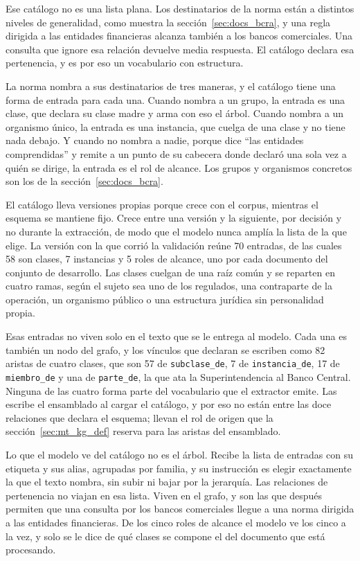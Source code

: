 \documentclass[12pt,a4paper]{report}
\begin{document}
Ese catálogo no es una lista plana. Los destinatarios de la norma están a distintos niveles de generalidad, como muestra la sección~\ref{sec:docs_bcra}, y una regla dirigida a las entidades financieras alcanza también a los bancos comerciales. Una consulta que ignore esa relación devuelve media respuesta. El catálogo declara esa pertenencia, y es por eso un vocabulario con estructura.

La norma nombra a sus destinatarios de tres maneras, y el catálogo tiene una forma de entrada para cada una. Cuando nombra a un grupo, la entrada es una clase, que declara su clase madre y arma con eso el árbol. Cuando nombra a un organismo único, la entrada es una instancia, que cuelga de una clase y no tiene nada debajo. Y cuando no nombra a nadie, porque dice \enquote{las entidades comprendidas} y remite a un punto de su cabecera donde declaró una sola vez a quién se dirige, la entrada es el rol de alcance. Los grupos y organismos concretos son los de la sección~\ref{sec:docs_bcra}.

El catálogo lleva versiones propias porque crece con el corpus, mientras el esquema se mantiene fijo. Crece entre una versión y la siguiente, por decisión y no durante la extracción, de modo que el modelo nunca amplía la lista de la que elige. La versión con la que corrió la validación reúne 70 entradas, de las cuales 58 son clases, 7 instancias y 5 roles de alcance, uno por cada documento del conjunto de desarrollo. Las clases cuelgan de una raíz común y se reparten en cuatro ramas, según el sujeto sea uno de los regulados, una contraparte de la operación, un organismo público o una estructura jurídica sin personalidad propia.

Esas entradas no viven solo en el texto que se le entrega al modelo. Cada una es también un nodo del grafo, y los vínculos que declaran se escriben como 82 aristas de cuatro clases, que son 57 de \texttt{subclase\_de}, 7 de \texttt{instancia\_de}, 17 de \texttt{miembro\_de} y una de \texttt{parte\_de}, la que ata la Superintendencia al Banco Central. Ninguna de las cuatro forma parte del vocabulario que el extractor emite. Las escribe el ensamblado al cargar el catálogo, y por eso no están entre las doce relaciones que declara el esquema; llevan el rol de origen que la sección~\ref{sec:mt_kg_def} reserva para las aristas del ensamblado.

Lo que el modelo ve del catálogo no es el árbol. Recibe la lista de entradas con su etiqueta y sus alias, agrupadas por familia, y su instrucción es elegir exactamente la que el texto nombra, sin subir ni bajar por la jerarquía. Las relaciones de pertenencia no viajan en esa lista. Viven en el grafo, y son las que después permiten que una consulta por los bancos comerciales llegue a una norma dirigida a las entidades financieras. De los cinco roles de alcance el modelo ve los cinco a la vez, y solo se le dice de qué clases se compone el del documento que está procesando.
\end{document}
